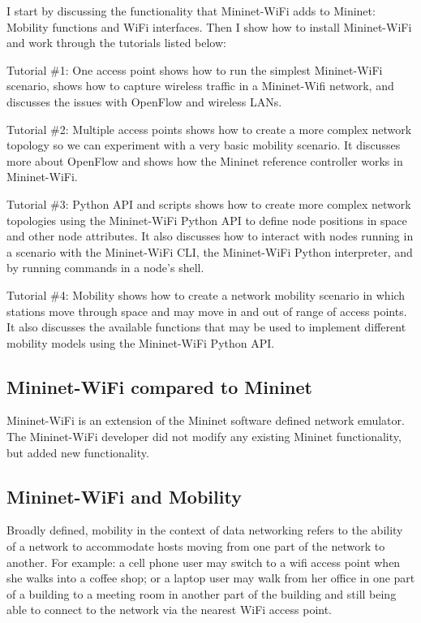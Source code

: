 I start by discussing the functionality that Mininet-WiFi adds to Mininet: Mobility functions and WiFi interfaces. Then I show how to install Mininet-WiFi and work through the tutorials listed below:

Tutorial \#1: One access point shows how to run the simplest Mininet-WiFi scenario, shows how to capture wireless traffic in a Mininet-Wifi network, and discusses the issues with OpenFlow and wireless LANs.

Tutorial \#2: Multiple access points shows how to create a more complex network topology so we can experiment with a very basic mobility scenario. It discusses more about OpenFlow and shows how the Mininet reference controller works in Mininet-WiFi.

Tutorial \#3: Python API and scripts shows how to create more complex network topologies using the Mininet-WiFi Python API to define node positions in space and other node attributes. It also discusses how to interact with nodes running in a scenario with the Mininet-WiFi CLI, the Mininet-WiFi Python interpreter, and by running commands in a node's shell.

Tutorial \#4: Mobility shows how to create a network mobility scenario in which stations move through space and may move in and out of range of access points. It also discusses the available functions that may be used to implement different mobility models using the Mininet-WiFi Python API.


\subsection{Mininet-WiFi compared to Mininet}

Mininet-WiFi is an extension of the Mininet software defined network emulator. The Mininet-WiFi developer did not modify any existing Mininet functionality, but added new functionality.

\subsection{Mininet-WiFi and Mobility}

Broadly defined, mobility in the context of data networking refers to the ability of a network to accommodate hosts moving from one part of the network to another. For example: a cell phone user may switch to a wifi access point when she walks into a coffee shop; or a laptop user may walk from her office in one part of a building to a meeting room in another part of the building and still being able to connect to the network via the nearest WiFi access point.

